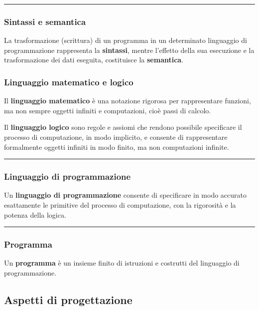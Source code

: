 \documentclass[a4paper]{article}
\newcommand{\longline}{\noindent\rule{\textwidth}{0.4pt}}
\begin{document}
	\longline
	
	\subsubsection{Sintassi e semantica}

	La trasformazione (scrittura) di un programma in un determinato linguaggio di programmazione rappresenta la \textcolor{Red3}{\textbf{sintassi}}, mentre l'effetto della sua esecuzione e la trasformazione dei dati eseguita, costituisce la \textcolor{Red3}{\textbf{semantica}}.\newpage
	
	\subsubsection{Linguaggio matematico e logico}
	
	Il \textcolor{Red3}{\textbf{linguaggio matematico}} è una notazione rigorosa per rappresentare funzioni, ma non sempre oggetti infiniti e computazioni, cioè passi di calcolo.\newline
	
	\noindent
	Il \textcolor{Red3}{\textbf{linguaggio logico}} sono regole e assiomi che rendono possibile specificare il processo di computazione, in modo implicito, e consente di rappresentare formalmente oggetti infiniti in modo finito, ma non computazioni infinite.
	
	\longline
	
	\subsubsection{Linguaggio di programmazione}
	
	\begin{boxdef}
		Un \textcolor{Red3}{\textbf{linguaggio di programmazione}} consente di specificare in modo accurato esattamente le primitive del processo di computazione, con la rigorosità e la potenza della logica.
	\end{boxdef}

	\longline
	
	\subsubsection{Programma}
	
	Un \textcolor{Red3}{\textbf{programma}} è un insieme finito di istruzioni e costrutti del linguaggio di programmazione.\newpage
		
	\subsection{Aspetti di progettazione}
	
\end{document}
